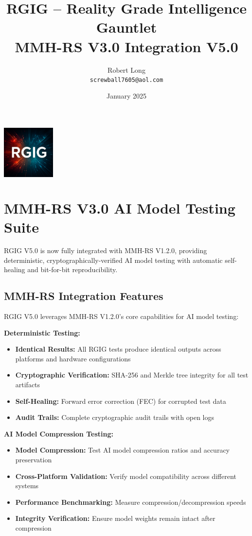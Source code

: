 \documentclass[11pt]{article}
\title{RGIG -- Reality Grade Intelligence Gauntlet\\MMH-RS V3.0 Integration V5.0}
\author{Robert Long \\ \texttt{screwball7605@aol.com}}
\date{January 2025}
\begin{document}
\maketitle

\begin{center}
  \includegraphics[width=0.2\textwidth]{RGIG.png}
\end{center}

\section*{MMH-RS V3.0 AI Model Testing Suite}
RGIG V5.0 is now fully integrated with MMH-RS V1.2.0, providing deterministic, cryptographically-verified AI model testing with automatic self-healing and bit-for-bit reproducibility.

\subsection*{MMH-RS Integration Features}
RGIG V5.0 leverages MMH-RS V1.2.0's core capabilities for AI model testing:

\textbf{Deterministic Testing:}
\begin{itemize}
  \item \textbf{Identical Results:} All RGIG tests produce identical outputs across platforms and hardware configurations
  \item \textbf{Cryptographic Verification:} SHA-256 and Merkle tree integrity for all test artifacts
  \item \textbf{Self-Healing:} Forward error correction (FEC) for corrupted test data
  \item \textbf{Audit Trails:} Complete cryptographic audit trails with open logs
\end{itemize}

\textbf{AI Model Compression Testing:}
\begin{itemize}
  \item \textbf{Model Compression:} Test AI model compression ratios and accuracy preservation
  \item \textbf{Cross-Platform Validation:} Verify model compatibility across different systems
  \item \textbf{Performance Benchmarking:} Measure compression/decompression speeds
  \item \textbf{Integrity Verification:} Ensure model weights remain intact after compression
\end{itemize}
\end{document}
